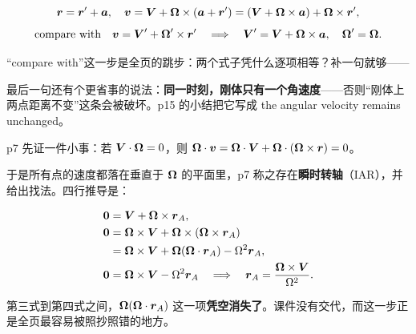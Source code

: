 \documentclass[11pt]{ctexart}
\begin{document}
\[
\boldsymbol{r}=\boldsymbol{r}'+\boldsymbol{a},\quad
\boldsymbol{v}=\boldsymbol{V}+\boldsymbol{\Omega}\times(\boldsymbol{a}+\boldsymbol{r}')=(\boldsymbol{V}+\boldsymbol{\Omega}\times\boldsymbol{a})+\boldsymbol{\Omega}\times\boldsymbol{r}',
\]
\[
\text{compare with}\quad \boldsymbol{v}=\boldsymbol{V}'+\boldsymbol{\Omega}'\times\boldsymbol{r}'
\quad\Longrightarrow\quad
\boldsymbol{V}'=\boldsymbol{V}+\boldsymbol{\Omega}\times\boldsymbol{a},\quad \boldsymbol{\Omega}'=\boldsymbol{\Omega}.
\]

“compare with”这一步是全页的跳步：两个式子凭什么逐项相等？补一句就够——


最后一句还有个更省事的说法：\textbf{同一时刻，刚体只有一个角速度}——否则“刚体上两点距离不变”这条会被破坏。p15 的小结把它写成 the angular velocity remains unchanged。



p7 先证一件小事：若 $\boldsymbol{V}\cdot\boldsymbol{\Omega}=0$，则
$\boldsymbol{\Omega}\cdot\boldsymbol{v}=\boldsymbol{\Omega}\cdot\boldsymbol{V}+\boldsymbol{\Omega}\cdot(\boldsymbol{\Omega}\times\boldsymbol{r})=0$。


于是所有点的速度都落在垂直于 $\boldsymbol{\Omega}$ 的平面里，p7 称之存在\textbf{瞬时转轴}（IAR），并给出找法。四行推导是：

\[
\begin{aligned}
\boldsymbol{0}&=\boldsymbol{V}+\boldsymbol{\Omega}\times\boldsymbol{r}_A,\\
\boldsymbol{0}&=\boldsymbol{\Omega}\times\boldsymbol{V}+\boldsymbol{\Omega}\times(\boldsymbol{\Omega}\times\boldsymbol{r}_A)\\
&=\boldsymbol{\Omega}\times\boldsymbol{V}+\boldsymbol{\Omega}(\boldsymbol{\Omega}\cdot\boldsymbol{r}_A)-\Omega^{2}\boldsymbol{r}_A,\\
\boldsymbol{0}&=\boldsymbol{\Omega}\times\boldsymbol{V}-\Omega^{2}\boldsymbol{r}_A
\quad\Longrightarrow\quad
\boldsymbol{r}_A=\frac{\boldsymbol{\Omega}\times\boldsymbol{V}}{\Omega^{2}} .
\end{aligned}
\]

第三式到第四式之间，$\boldsymbol{\Omega}(\boldsymbol{\Omega}\cdot\boldsymbol{r}_A)$ 这一项\textbf{凭空消失了}。课件没有交代，而这一步正是全页最容易被照抄照错的地方。
\end{document}
